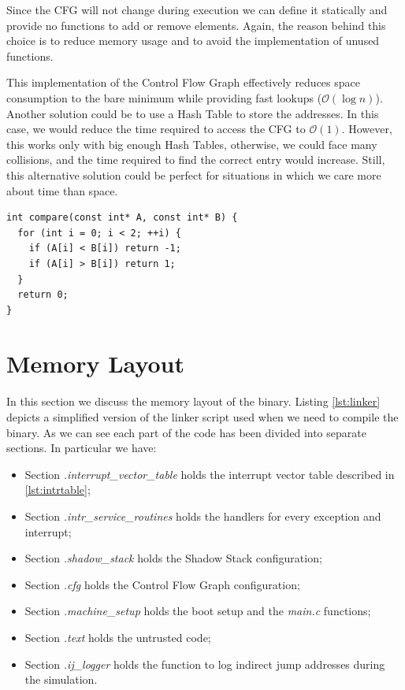 Since the CFG will not change during execution we can define it statically and
provide no functions to add or remove elements. Again, the reason behind this
choice is to reduce memory usage and to avoid the implementation of unused
functions.

This implementation of the Control Flow Graph effectively reduces space
consumption to the bare minimum while providing fast lookups ($\mathcal{O}(\log{n}
)$). Another solution could be to use a Hash Table to store the addresses. In
this case, we would reduce the time required to access the CFG to $\mathcal{O}(1)$.
However, this works only with big enough Hash Tables, otherwise, we could face many
collisions, and the time required to find the correct entry would increase. Still,
this alternative solution could be perfect for situations in which we care more
about time than space.

\begin{lstlisting}[style=CStyle, caption= Comparison for binary search, label={lst:binsearch}]
int compare(const int* A, const int* B) {
  for (int i = 0; i < 2; ++i) {
    if (A[i] < B[i]) return -1;
    if (A[i] > B[i]) return 1;
  }
  return 0;
}
\end{lstlisting}

\section{Memory Layout}
\label{sec:layout}

In this section we discuss the memory layout of the binary. Listing \ref{lst:linker}
depicts a simplified version of the linker script used when we need to compile the
binary. As we can see each part of the code has been divided into separate
sections. In particular we have:
\begin{itemize}[noitemsep]
  \item Section \textit{.interrupt\_vector\_table} holds the interrupt vector
    table described in \ref{lst:intrtable};

  \item Section \textit{.intr\_service\_routines} holds the handlers for every
    exception and interrupt;

  \item Section \textit{.shadow\_stack} holds the Shadow Stack configuration;

  \item Section \textit{.cfg} holds the Control Flow Graph configuration;

  \item Section \textit{.machine\_setup} holds the boot setup and the \textit{main.c}
    functions;

  \item Section \textit{.text} holds the untrusted code;

  \item Section \textit{.ij\_logger} holds the function to log indirect jump
    addresses during the simulation.
\end{itemize}

